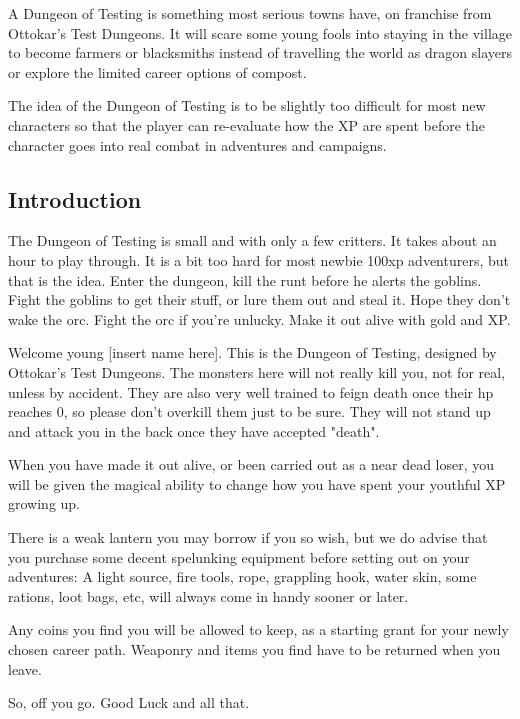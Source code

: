 A Dungeon of Testing is something most serious towns have, on franchise from Ottokar's Test Dungeons. It will scare some young fools into staying in the village to become farmers or blacksmiths instead of travelling the world as dragon slayers or explore the limited career options of compost. 

The idea of the Dungeon of Testing is to be slightly too difficult for most new characters so that the player can re-evaluate how the XP are spent before the character goes into real combat in adventures and campaigns.




\subsection*{Introduction}

The Dungeon of Testing is small and with only a few critters. It takes about an hour to play through. It is a bit too hard for most newbie 100xp adventurers, but that is the idea. Enter the dungeon, kill the runt before he alerts the goblins. Fight the goblins to get their stuff, or lure them out and steal it. Hope they don't wake the orc. Fight the orc if you're unlucky. Make it out alive with gold and XP.

\begin{readoutloud}
Welcome young [insert name here]. This is the Dungeon of Testing, designed by Ottokar's Test Dungeons. The monsters here will not really kill you, not for real, unless by accident. They are also very well trained to feign death once their hp reaches 0, so please don't overkill them just to be sure. They will not stand up and attack you in the back once they have accepted "death".

When you have made it out alive, or been carried out as a near dead loser, you will be given the magical ability to change how you have spent your youthful XP growing up.

There is a weak lantern you may borrow if you so wish, but we do advise that you purchase some decent spelunking equipment before setting out on your adventures: A light source, fire tools, rope, grappling hook, water skin, some rations, loot bags, etc, will always come in handy sooner or later.

Any coins you find you will be allowed to keep, as a starting grant for your newly chosen career path. Weaponry and items you find have to be returned when you leave.

So, off you go. Good Luck and all that.
\end{readoutloud}


